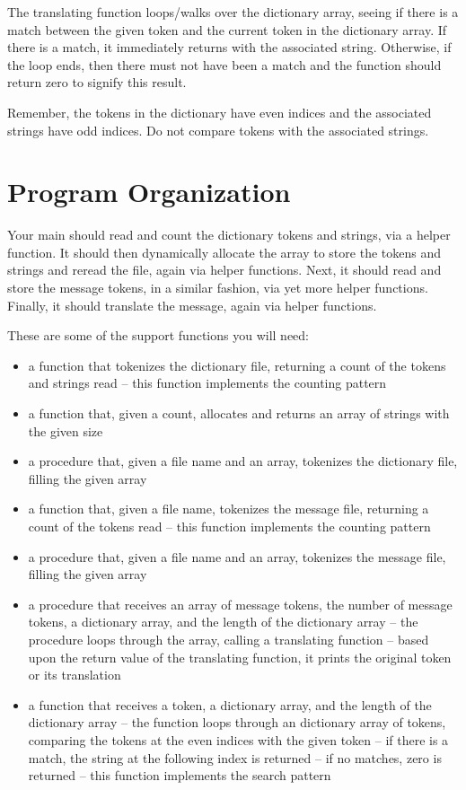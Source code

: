 \documentclass[12pt]{article}
\begin{document}
The translating function loops/walks over the dictionary array, seeing if
there is a match between the given token and the current
token in the dictionary array. If there is a match, it immediately
returns with the associated string. Otherwise, if the loop
ends, then there must not have been a match and the function
should return zero to signify this result.

Remember, the tokens in the dictionary have even indices
and the associated strings have odd indices. Do not
compare tokens with the associated strings.

\section*{Program Organization}

Your main should read and count the dictionary tokens and strings,
via a helper function.
It should
then dynamically allocate the array to store the tokens and strings and reread
the file, again via helper functions.
Next, it should
read and store the message tokens, in a similar fashion, via yet more helper
functions.
Finally, it should translate the message, again via helper functions.

These are some of the support functions you will need:

\begin{itemize}
\item
    a function
    that tokenizes the dictionary file, returning a count of the
    tokens and strings read -- this function implements the counting pattern
\item
    a function that, given a count, allocates and returns an
    array of strings with the given size
\item
    a procedure that, given a file name and an array,
    tokenizes the dictionary file,
    filling the given array
\item
    a function
    that, given a file name,
    tokenizes the message file, returning a count of the
    tokens read -- this function implements the counting pattern
\item
    a procedure that, given a file name and an array,
    tokenizes the message file,
    filling the given array
\item
    a procedure
    that receives an array of message tokens, the number of message tokens, a dictionary array, and the length of the dictionary array -- the
    procedure loops through the array, calling a translating function --
    based upon the return value of the translating function,
    it prints the original token or its translation
\item
    a function that receives a token, a dictionary array, and the length of the dictionary array --
    the function loops through an dictionary array of tokens, comparing
    the tokens at the even indices with the given token --
    if there is a match, the string at the following index is returned --
    if no matches, zero is returned -- this function implements
    the search pattern
\end{itemize}
\end{document}
